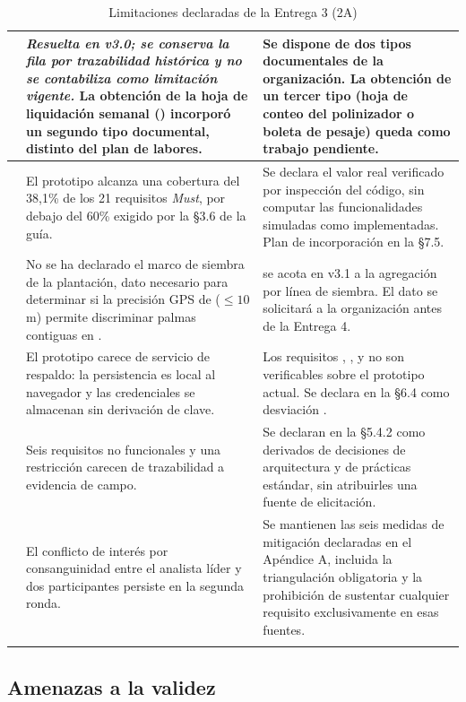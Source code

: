 \begin{longtable}{|C{1.2cm}|L{6.4cm}|L{7.4cm}|}
 & \emph{Resuelta en v3.0; se conserva la fila por trazabilidad histórica y no se contabiliza como limitación vigente.} La obtención de la hoja de liquidación semanal () incorporó un segundo tipo documental, distinto del plan de labores. & Se dispone de dos tipos documentales de la organización. La obtención de un tercer tipo (hoja de conteo del polinizador o boleta de pesaje) queda como trabajo pendiente. \\ \hline
{} & El prototipo alcanza una cobertura del 38{,}1\% de los 21 requisitos \emph{Must}, por debajo del 60\% exigido por la §3.6 de la guía. & Se declara el valor real verificado por inspección del código, sin computar las funcionalidades simuladas como implementadas. Plan de incorporación en la §7.5. \\ \hline
{} & No se ha declarado el marco de siembra de la plantación, dato necesario para determinar si la precisión GPS de  ($\leq 10$ m) permite discriminar palmas contiguas en . &  se acota en v3.1 a la agregación por línea de siembra. El dato se solicitará a la organización antes de la Entrega 4. \\ \hline
{} & El prototipo carece de servicio de respaldo: la persistencia es local al navegador y las credenciales se almacenan sin derivación de clave. & Los requisitos , ,  y  no son verificables sobre el prototipo actual. Se declara en la §6.4 como desviación . \\ \hline
{} & Seis requisitos no funcionales y una restricción carecen de trazabilidad a evidencia de campo. & Se declaran en la §5.4.2 como derivados de decisiones de arquitectura y de prácticas estándar, sin atribuirles una fuente de elicitación. \\ \hline
{} & El conflicto de interés por consanguinidad entre el analista líder y dos participantes persiste en la segunda ronda. & Se mantienen las seis medidas de mitigación declaradas en el Apéndice A, incluida la triangulación obligatoria y la prohibición de sustentar cualquier requisito exclusivamente en esas fuentes. \\ \hline
\caption{Limitaciones declaradas de la Entrega 3 (2A)}
\label{tab:limitaciones}
\end{longtable}

\subsection{Amenazas a la validez}

